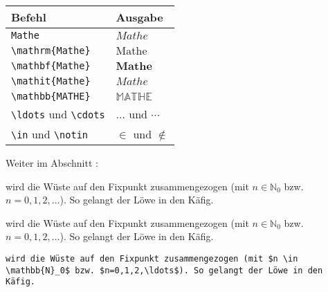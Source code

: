 \documentclass["WS\space 16-17\space -\space LaTeX-Kurs\space -\space Praesentation\space -\space 1.tex"]{subfiles}
\begin{document}
\begin{frame}[fragile]
	\begin{center}
		\begin{tabular}{ll}
			\toprule
			Befehl							&	Ausgabe					\\ \midrule
			\lstinline|Mathe|				&	$Mathe$					\\
			\lstinline|\mathrm{Mathe}|		&	$\mathrm{Mathe}$		\\
			\lstinline|\mathbf{Mathe}|		&	$\mathbf{Mathe}$		\\
			\lstinline|\mathit{Mathe}|		&	$\mathit{Mathe}$		\\
			\lstinline|\mathbb{MATHE}|					&	$\mathbb{MATHE}$		\\
			\lstinline|\ldots| und \lstinline|\cdots|	&	$\ldots$ und $\cdots$	\\
			\lstinline|\in| und \lstinline|\notin|		&	$\in$ und $\notin$		\\
			\bottomrule
		\end{tabular}
	\end{center}
	\pause\btVFill
	\Aufgabee
	Weiter im Abschnitt :
	\begin{outputbox}
		wird die Wüste auf den Fixpunkt zusammengezogen (mit $n \in \mathbb{N}_0$ bzw. $n=0,1,2,\ldots$). So gelangt der Löwe in den Käfig.
	\end{outputbox}
	\vspace{1.3cm}
\end{frame}
\begin{frame}[fragile]
	\Losung
	\begin{outputbox}
		wird die Wüste auf den Fixpunkt zusammengezogen (mit $n \in \mathbb{N}_0$ bzw. $n=0,1,2,\ldots$). So gelangt der Löwe in den Käfig.
	\end{outputbox}

	\Code
	\begin{lstlisting}[gobble=4]
    wird die Wüste auf den Fixpunkt zusammengezogen (mit $n \in \mathbb{N}_0$ bzw. $n=0,1,2,\ldots$). So gelangt der Löwe in den Käfig.
	\end{lstlisting}
\end{frame}
\end{document}
